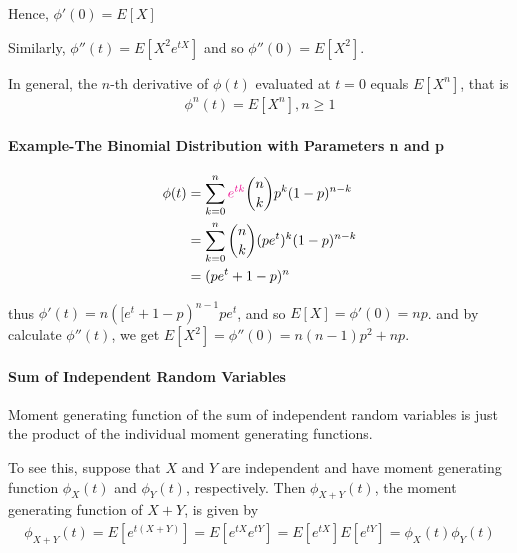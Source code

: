 \documentclass[10 pt,final]{article}
\newcommand{\impo}[1]{{\color{magenta} #1}}
\begin{document}
Hence, $\phi'(0) = E[X]$

Similarly, $\phi''(t) = E[X^2 e^{tX}]$ and so $\phi''(0) = E[X^2]$.

In general, the $n$-th derivative of $\phi(t)$ evaluated at $t=0$ equals $E[X^n]$, that is
\begin{align*}
\phi^n(t) = E[X^n], n \geq 1
\end{align*}

\paragraph{Example-The Binomial Distribution with Parameters n and p} 
\begin{align*}
\phi(t) & = \sum^n_{k=0} \impo{e^{tk}} \binom{n}{k} p^k (1-p)^{n-k} \\
& = \sum^n_{k=0} \binom{n}{k} (pe^t)^k(1-p)^{n-k} \\
& =(pe^t+1-p)^n
\end{align*}

thus $\phi'(t) = n([e^t+1-p)^{n-1} pe^t$, and so $E[X] = \phi'(0) = np$.
and by calculate $\phi''(t)$, we get $E[X^2] = \phi''(0) = n(n-1)p^2 + np$. 


\paragraph{Sum of Independent Random Variables} Moment generating function of the sum of independent random variables is just the product of the individual moment generating functions. 

To see this, suppose that $X$ and $Y$ are independent and have moment generating function $\phi_X(t)$ and $\phi_Y(t)$, respectively. Then $\phi_{X+Y}(t)$, the moment generating function of $X+Y$, is given by
\begin{align*}
\phi_{X+Y}(t) = E[e^{t(X+Y)}] = E[e^{tX} e^{tY}] = E[e^{tX}] E[e^{tY}] = \phi_X(t) \phi_Y(t)
\end{align*}
\end{document}
